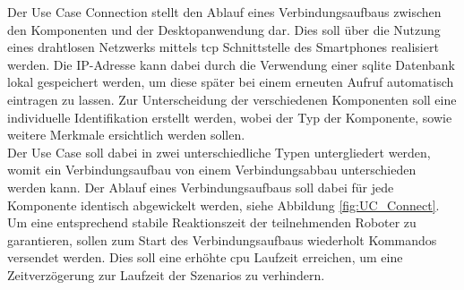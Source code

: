 Der Use Case Connection stellt den Ablauf eines Verbindungsaufbaus zwischen den Komponenten und der Desktopanwendung dar. Dies soll über die Nutzung eines drahtlosen Netzwerks mittels \gls{tcp} Schnittstelle des Smartphones realisiert werden. Die IP-Adresse kann dabei durch die Verwendung einer \gls{sqlite} Datenbank lokal gespeichert werden, um diese später bei einem erneuten Aufruf automatisch eintragen zu lassen. Zur Unterscheidung der verschiedenen Komponenten soll eine individuelle Identifikation erstellt werden, wobei der Typ der Komponente, sowie weitere Merkmale ersichtlich werden sollen.\\
Der Use Case soll dabei in zwei unterschiedliche Typen untergliedert werden, womit ein Verbindungsaufbau von einem Verbindungsabbau unterschieden werden kann. Der Ablauf eines Verbindungsaufbaus soll dabei für jede Komponente identisch 
abgewickelt werden, siehe Abbildung \ref{fig:UC_Connect}. Um eine entsprechend stabile Reaktionszeit der teilnehmenden Roboter zu garantieren, sollen zum Start des Verbindungsaufbaus wiederholt Kommandos versendet werden. Dies soll eine erhöhte \gls{cpu} Laufzeit erreichen, um eine Zeitverzögerung zur Laufzeit der Szenarios zu verhindern.\\

